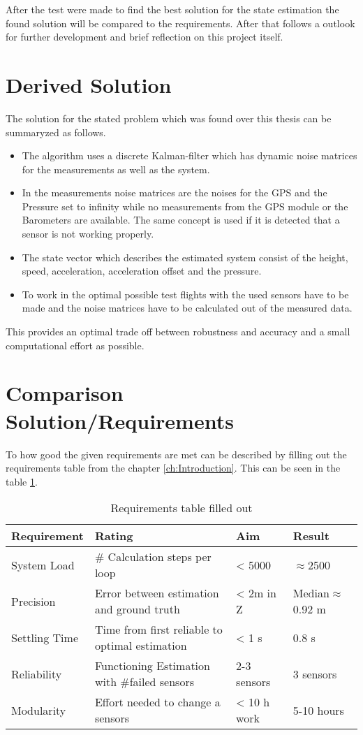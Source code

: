 After the test were made to find the best solution for the state estimation
the found solution will be compared to the requirements.
After that follows a outlook for further development and brief reflection on this project itself.

\section{Derived Solution}
The solution for the stated problem which was found over this thesis can be summaryzed as follows.
\begin{itemize}
 \item The algorithm uses a discrete Kalman-filter which has dynamic noise matrices for the measurements as well as the system.
 \item In the measurements noise matrices are the noises for the GPS and the Pressure set to infinity while no measurements from the GPS module or the Barometers are available.
The same concept is used if it is detected that a sensor is not working properly.
 \item The state vector which describes the estimated system consist of the height, speed, acceleration, acceleration offset and the pressure.
 \item To work in the optimal possible test flights with the used sensors have to be made and the noise matrices have to be calculated out of the measured data.
\end{itemize}

This provides an optimal trade off between robustness and accuracy and a small computational effort as possible.

\section{Comparison Solution/Requirements}
To how good the given requirements are met can be described by filling out the requirements table from the chapter \ref{ch:Introduction}.
This can be seen in the table \ref{tab:RequirementsFilledOut}.

 \begin{table}[h]
 \centering
 \begin{tabular}{|l|l|l|l|}	
 \hline	
 \bf{Requirement}   & \bf{Rating} & \bf{Aim} & \bf{Result} \\ \hline
 System Load   & \# Calculation steps per loop & < 5000 & $\approx$2500 \\ \hline
 Precision     & Error between estimation and ground truth  & < 2m in Z & Median$\approx$ 0.92 m  \\ \hline
 Settling Time & Time from first reliable to optimal estimation  & < 1 s &  0.8 s \\ \hline
 Reliability   & Functioning Estimation with \#failed sensors & 2-3 sensors & 3 sensors \\ \hline	
 Modularity    & Effort needed to change a sensors & < 10 h work &  5-10 hours \\ \hline
 \end{tabular}	
 \caption{Requirements table filled out}
 \label{tab:RequirementsFilledOut}
 \end{table}
 
